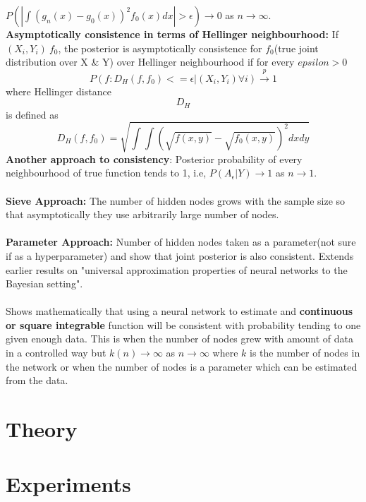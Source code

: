 \documentclass[a4paper,twocolumn]{article}
\begin{document}
\( P(|\int(\hat{g_n}(x) - g_0(x))^2f_0(x)dx| > \epsilon) \xrightarrow{} 0 \) as \( n \xrightarrow{} \infty\).
\\
\textbf{Asymptotically consistence in terms of Hellinger neighbourhood:} If \( (X_i, Y_i) ~ f_0 \), the posterior is asymptotically consistence for \(f_0\)(true joint distribution over X \& Y) over Hellinger neighbourhood if for every \(epsilon>0\)
\begin{equation}
    P({f: D_H(f,f_0) <= \epsilon}|(X_i, Y_i) \forall i) \xrightarrow{p} 1
\end{equation}
where Hellinger distance $$D_H$$ is defined as 
\begin{equation*}
    D_H(f, f_0) = \sqrt{\int\int(\sqrt{f(x, y)}-\sqrt{f_0(x, y)})^2 dx dy}
\end{equation*}
\textbf{Another approach to consistency}: Posterior probability of every neighbourhood of true function tends to 1, i.e, \(P(A_\epsilon|Y) \longrightarrow 1\) as \(n\xrightarrow{}1\).
\\\\
\textbf{Sieve Approach:} The number of hidden nodes grows with the sample size so that asymptotically they use arbitrarily large number of nodes.
\\\\
\textbf{Parameter Approach:} Number of hidden nodes taken as a parameter(not sure if as a hyperparameter) and show that joint posterior is also consistent.
Extends earlier results on "universal approximation properties of neural networks to the Bayesian setting".
\\\\
Shows mathematically that using a neural network to estimate and \textbf{continuous or square integrable} function will be consistent with probability tending to one given enough data. This is when the number of nodes grew with amount of data in a controlled way but \(k(n) \xrightarrow{} \infty\) as \(n \xrightarrow{} \infty\) where \(k\) is the number of nodes in the network or when the number of nodes is a parameter which can be estimated from the data.    

\section{Theory}
\label{sec-4}

\section{Experiments}
\label{sec-5}
\end{document}
